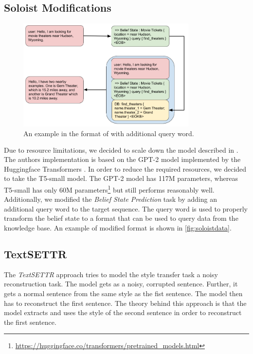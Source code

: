 \documentclass[twocolumn]{tum-article}
\begin{document}
\subsection{Soloist Modifications}
\label{sec:soloist_mod}
\begin{figure}[!h]
\centering
\includegraphics[width=0.8\textwidth]{figures/Soloist_Data.png}
\caption{An example in the format of \cite{peng2020soloist} with additional query word.}
\label{fig:soloistdata}
\end{figure}
Due to resource limitations, we decided to scale down the model described in \cite{peng2020soloist}. The authors implementation is based on the GPT-2 model \cite{radford2019language} implemented by the Huggingface Transformers \cite{wolf2019huggingface}. In order to reduce the required resources, we decided to take the T5-small \cite{raffel2019exploring} model. The GPT-2 model has 117M parameters, whereas T5-small has only 60M parameters\footnote{\url{https://huggingface.co/transformers/pretrained_models.html}} but still performs reasonably well.
Additionally, we modified the \textit{Belief State Prediction} task by adding an additional query word to the target sequence. The query word is used to properly transform the belief state to a format that can be used to query data from the knowledge base. An example of modified format is shown in \autoref{fig:soloistdata}. 
\subsection{TextSETTR} \label{sec:textsettr}
The \textit{TextSETTR} \cite{riley2020textsettr} approach tries to model the style transfer task a noisy reconstruction task. The model gets as a noisy, corrupted sentence. Further, it gets a normal sentence from the same style as the fist sentence. The model then has to reconstruct the first sentence. The theory behind this approach is that the model extracts and uses the style of the second sentence in order to reconstruct the first sentence.\\
\end{document}
